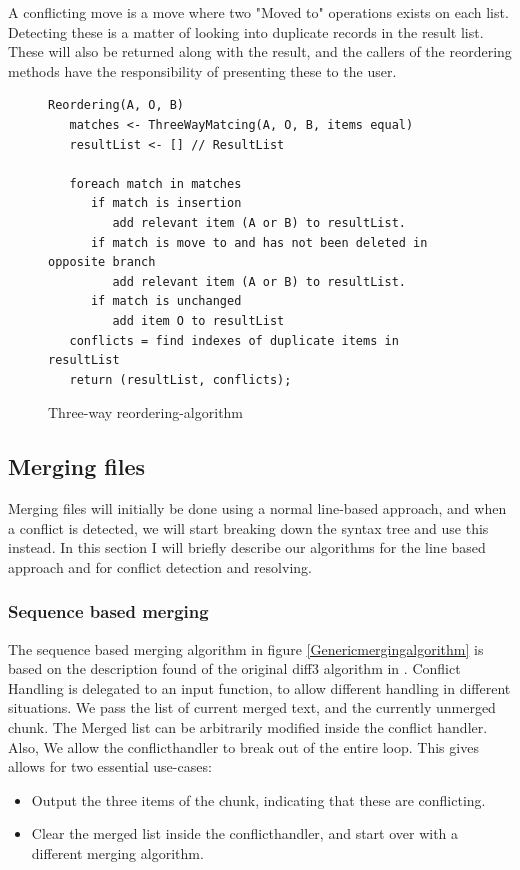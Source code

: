 \documentclass[11pt]{article}
\begin{document}
A conflicting move is a move where two "Moved to" operations exists on each list. Detecting these is a matter of looking into duplicate records in the result list. These will also be returned along with the result, and the callers of the reordering methods have the responsibility of presenting these to the user.
\begin{figure}
\begin{verbatim}
Reordering(A, O, B)
   matches <- ThreeWayMatcing(A, O, B, items equal)
   resultList <- [] // ResultList
   
   foreach match in matches
      if match is insertion
         add relevant item (A or B) to resultList.
      if match is move to and has not been deleted in opposite branch
         add relevant item (A or B) to resultList.
      if match is unchanged
         add item O to resultList
   conflicts = find indexes of duplicate items in resultList
   return (resultList, conflicts);
\end{verbatim}
\caption{Three-way reordering-algorithm}
  \label{ThreeWayReorderingAlgorithm}
\end{figure}

\subsection{Merging files}
Merging files will initially be done using a normal line-based approach, and when a conflict is detected, we will start breaking down the syntax tree and use this instead. In this section I will briefly describe our algorithms for the line based approach and for conflict detection and resolving.

\subsubsection{Sequence based merging}
The sequence based merging algorithm in figure \ref{Genericmergingalgorithm} is based on the description found of the original diff3 algorithm in \citet{Khanna}. Conflict Handling is delegated to an input function, to allow different handling in different situations. We pass the list of current merged text, and the currently unmerged chunk. The Merged list can be arbitrarily modified inside the conflict handler. Also, We allow the conflicthandler to break out of the entire loop. This gives allows for two essential use-cases:

\begin{itemize}
   \item Output the three items of the chunk, indicating that these are conflicting.
   \item Clear the merged list inside the conflicthandler, and start over with a different merging algorithm.
\end{itemize}
\end{document}
